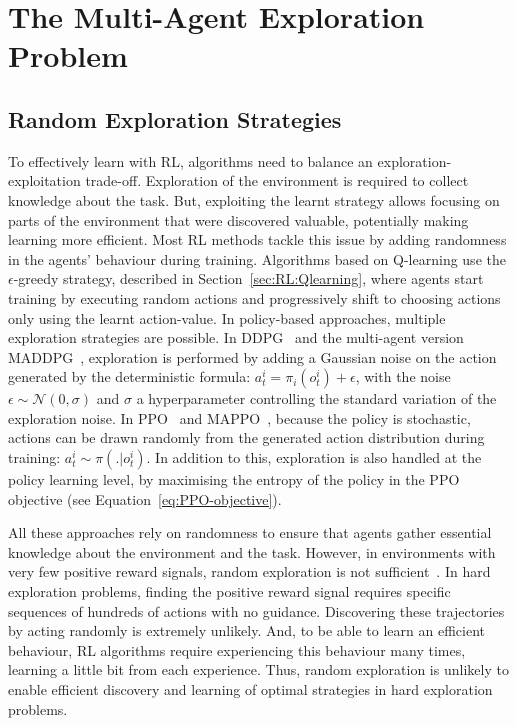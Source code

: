 \section{The Multi-Agent Exploration Problem}\label{sec:JIM:ExploProblem}

\subsection{Random Exploration Strategies}

To effectively learn with RL, algorithms need to balance an exploration-exploitation trade-off. Exploration of the environment is required to collect knowledge about the task. But, exploiting the learnt strategy allows focusing on parts of the environment that were discovered valuable, potentially making learning more efficient. 
Most RL methods tackle this issue by adding randomness in the agents' behaviour during training. Algorithms based on Q-learning use the $\epsilon$-greedy strategy, described in Section~\ref{sec:RL:Qlearning}, where agents start training by executing random actions and progressively shift to choosing actions only using the learnt action-value. 
In policy-based approaches, multiple exploration strategies are possible. 
In DDPG~\citep{Lillicrap2015_DDPG} and the multi-agent version MADDPG~\citep{Lowe2017_MADDPG}, exploration is performed by adding a Gaussian noise on the action generated by the deterministic formula: $a^i_t=\pi_i(o^i_t)+\epsilon$, with the noise $\epsilon\sim\mathcal{N}(0,\sigma)$ and $\sigma$ a hyperparameter controlling the standard variation of the exploration noise. 
In PPO~\citep{Schulman2017_PPO} and MAPPO~\citep{Yu2021_MAPPO}, because the policy is stochastic, actions can be drawn randomly from the generated action distribution during training: $a^i_t\sim\pi(.|o^i_t)$. In addition to this, exploration is also handled at the policy learning level, by maximising the entropy of the policy in the PPO objective (see Equation~\ref{eq:PPO-objective}). 

All these approaches rely on randomness to ensure that agents gather essential knowledge about the environment and the task. However, in environments with very few positive reward signals, random exploration is not sufficient~\citep{Ostrovski2017_PseudoCounts, Pathak2017_ICM, Burda2019_RND}. In hard exploration problems, finding the positive reward signal requires specific sequences of hundreds of actions with no guidance. Discovering these trajectories by acting randomly is extremely unlikely. And, to be able to learn an efficient behaviour, RL algorithms require experiencing this behaviour many times, learning a little bit from each experience. Thus, random exploration is unlikely to enable efficient discovery and learning of optimal strategies in hard exploration problems. 





